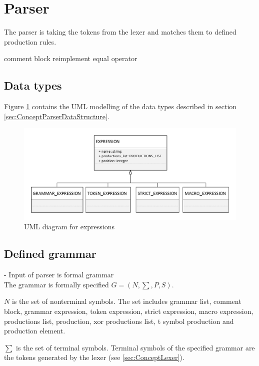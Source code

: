 \section{Parser}\label{sec:ImplementationParser}

The parser is taking the tokens from the lexer and matches them to defined production rules.




comment block reimplement equal operator

\subsection{Data types}\label{sec:ImplementationDataTypes}
Figure \ref{fig:ImplementationUMLExpressions} contains the UML modelling of the data types described in section \ref{sec:ConceptParserDataStructure}.
\begin{figure}[H]
\centering
\includegraphics[width=1\textwidth]{images/uml_data_types_expressions.pdf}
\caption{UML diagram for expressions}
\label{fig:ImplementationUMLExpressions}
\end{figure}

\subsection{Defined grammar}\label{sec:ImplementationGrammar}

- Input of parser is formal grammar \\

The grammar is formally specified $G = (N,\sum,P,S)$.

$N$ is the set of nonterminal symbols. The set includes grammar list, comment block, grammar expression, token expression, strict expression, macro expression, productions list, production, xor productions list, t symbol production and production element.

$\sum$ is the set of terminal symbols. Terminal symbols of the specified grammar are the tokens generated by the lexer (see \ref{sec:ConceptLexer}).

